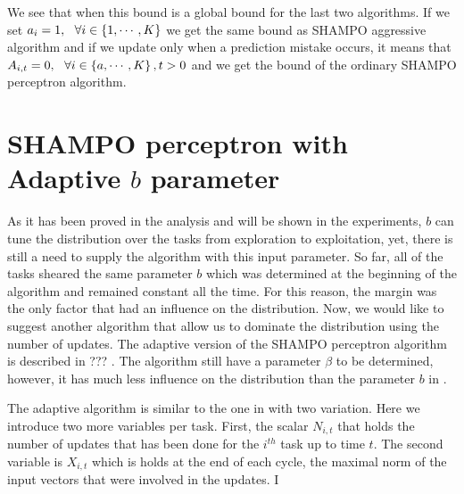 {We see that when this  bound is a global bound for the last two algorithms. 
If we set $a_i=1, ~~\forall i\in\left\{{1,\cdots,K}\right\}$ we get the same bound as  SHAMPO aggressive 
algorithm and if we update only when a prediction mistake occurs, it means that 
$A_{i,t}=0,~~\forall i\in\left\{{a,\cdots,K}\right\},t>0$ and we get the bound of  the ordinary 
SHAMPO perceptron algorithm.

\section{SHAMPO perceptron with Adaptive $b$ parameter}

As it has been proved in the analysis and will be shown in the experiments, $b$ can tune the distribution over the tasks from exploration to exploitation, yet, there is still a need to supply the algorithm with this input parameter. So far, all of the tasks sheared the same parameter $b$ which was determined at the beginning of the algorithm and remained constant all the time. For this reason, the margin was the only factor that had an influence on the distribution. Now, we would like to suggest another algorithm that allow us to  dominate the distribution using the number of updates. The adaptive version of the  SHAMPO perceptron algorithm is  described in  ??? . The algorithm still have a parameter $\beta$ to be determined, however, it has much less influence on the distribution than the parameter $b$ in  .

The adaptive algorithm is similar to the one in  with two variation. Here we introduce two more variables per task. First, the scalar $N_{i,t}$ that holds the number of updates that has been done for the $i^{th}$ task  up to time $t$. The second variable is $X_{i,t}$ which is holds at the end of each cycle,  the maximal norm of the input vectors that were involved in the updates. I

}
